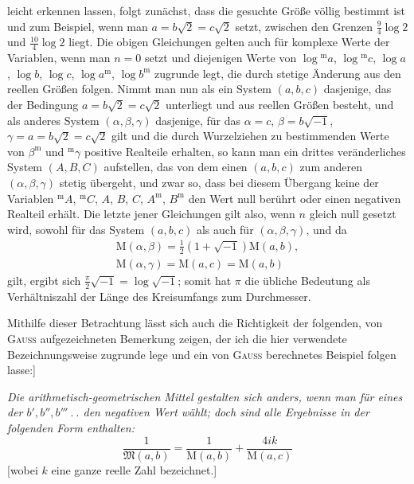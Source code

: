 leicht erkennen lassen, folgt zunächst, dass die gesuchte Größe völlig bestimmt ist und zum Beispiel, wenn man $a=b\surd2=c\surd2$ setzt, zwischen den Grenzen $\frac94\log2$ und $\frac{10}4\log2$ liegt. Die obigen Gleichungen gelten auch für komplexe Werte der Variablen, wenn man $n=0$ setzt und diejenigen Werte von $\log{}^{\mathrm{m}}a$, $\log{}^{\mathrm{m}}c$, $\log a$, $\log b$, $\log c$, $\log a^{\mathrm{m}}$, $\log b^{\mathrm{m}}$ zugrunde legt, die durch stetige Änderung aus den reellen Größen folgen. Nimmt man nun als ein System $(a,b,c)$ dasjenige, das der Bedingung $a=b\surd2=c\surd2$ unterliegt und aus reellen Größen besteht, und als anderes System $(\alpha,\beta,\gamma)$ dasjenige, für das $\alpha=c$, $\beta=b\surd{-1}$, $\gamma=a=b\surd2=c\surd2$ gilt und die durch Wurzelziehen zu bestimmenden Werte von $\beta^{\mathrm{m}}$ und ${}^{\mathrm{m}}\gamma$ positive Realteile erhalten, so kann man ein drittes veränderliches System $(A,B,C)$ aufstellen, das von dem einen $(a,b,c)$ zum anderen $(\alpha,\beta,\gamma)$ stetig übergeht, und zwar
so, dass bei diesem Übergang keine der Variablen ${}^{\mathrm{m}}A$, ${}^{\mathrm{m}}C$, $A$, $B$, $C$, $A^{\mathrm{m}}$, $B^{\mathrm{m}}$ den Wert null berührt oder einen negativen Realteil erhält. Die letzte jener Gleichungen gilt also, wenn $n$ gleich null gesetzt wird, sowohl für das System $(a,b,c)$ als auch für $(\alpha,\beta,\gamma)$, und da
\[
\begin{gathered}\mathrm{M}(\alpha,\beta)=\tfrac12(1+\surd{-1})\mathrm{M}(a,b),\\[7pt]
\mathrm{M}(\alpha,\gamma)=\mathrm{M}(a,c)=\mathrm{M}(a,b)\end{gathered}
\]
gilt, ergibt sich $\frac{\pi}{2}\surd{-1}=\log\surd{-1}$; somit hat $\pi$ die übliche Bedeutung als Verhältniszahl der Länge des Kreisumfangs zum Durchmesser.

\par Mithilfe dieser Betrachtung lässt sich auch die Richtigkeit der folgenden, von \textsc{Gauss} aufgezeichneten Bemerkung zeigen, der ich die hier verwendete Bezeichnungsweise zugrunde lege und ein von \textsc{Gauss} berechnetes Beispiel folgen lasse:]
\par \textit{Die arithmetisch-geometrischen Mittel gestalten sich anders, wenn man für eines der $b', b'', b'''\ .\ .$ den negativen Wert wählt; doch sind alle Ergebnisse in der folgenden Form enthalten:}
\[
\frac{1}{\mathfrak{M}(a,b)}=\frac{1}{\mathrm{M}(a,b)}+\frac{4ik}{\mathrm{M}(a,c)}
\]
[wobei $k$ eine ganze reelle Zahl bezeichnet.]

